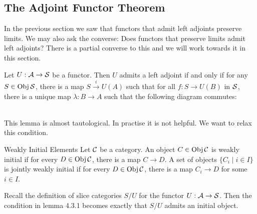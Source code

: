 \documentclass[a4paper]{article}
\begin{document}
\subsection{The Adjoint Functor Theorem}
In the previous section we saw that functors that admit left adjoints preserve limits. We may also ask the converse: Does functors that preserve limits admit left adjoints? There is a partial converse to this and we will work towards it in this section. 

\begin{lmm}{}{} Let $U:\mathcal{A}\to\mathcal{S}$ be a functor. Then $U$ admits a left adjoint if and only if for any $S\in\operatorname{Obj}\mathcal{S}$, there is a map $S\overset{i}{\to}U(A)$ such that for all $f:S\to U(B)$ in $\mathcal{S}$, there is a unique map $\lambda:B\to A$ such that the following diagram commutes: \\~\\
\end{lmm}

This lemma is almost tautological. In practise it is not helpful. We want to relax this condition. 

\begin{defn}{Weakly Initial Elements}{} Let $\mathcal{C}$ be a category. An object $C\in\operatorname{Obj}\mathcal{C}$ is weakly initial if for every $D\in\operatorname{Obj}\mathcal{C}$, there is a map $C\to D$. A set of objects $\{C_i\;|\;i\in I\}$ is jointly weakly initial if for every $D\in\operatorname{Obj}\mathcal{C}$, there is a map $C_i\to D$ for some $i\in I$. 
\end{defn}

Recall the definition of slice categories $S/U$ for the functor $U:\mathcal{A}\to\mathcal{S}$. Then the condition in lemma 4.3.1 becomes exactly that $S/U$ admits an initial object. 
\end{document}
